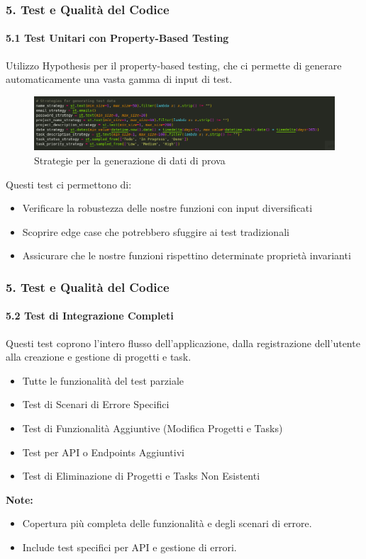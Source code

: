 \documentclass{beamer}
\begin{document}
\begin{frame}[fragile]
\frametitle{5. Test e Qualità del Codice}
\framesubtitle{5.1 Test Unitari con Property-Based Testing}
Utilizzo Hypothesis per il property-based testing, che ci permette di generare automaticamente una vasta gamma di input di test.

\begin{figure}
\includegraphics[width=\textwidth]{test_data.png}
\caption{Strategie per la generazione di dati di prova}
\end{figure}

Questi test ci permettono di:
\begin{itemize}
\item Verificare la robustezza delle nostre funzioni con input diversificati
\item Scoprire edge case che potrebbero sfuggire ai test tradizionali
\item Assicurare che le nostre funzioni rispettino determinate proprietà invarianti
\end{itemize}
\end{frame}

\begin{frame}[fragile]
\frametitle{5. Test e Qualità del Codice}
\framesubtitle{5.2 Test di Integrazione Completi}
Questi test coprono l'intero flusso dell'applicazione, dalla registrazione dell'utente alla creazione e gestione di progetti e task.

\begin{itemize}
    \item Tutte le funzionalità del test parziale
    \item Test di Scenari di Errore Specifici
    \item Test di Funzionalità Aggiuntive (Modifica Progetti e Tasks)
    \item Test per API o Endpoints Aggiuntivi
    \item Test di Eliminazione di Progetti e Tasks Non Esistenti
\end{itemize}

\textbf{Note:}
\begin{itemize}
    \item Copertura più completa delle funzionalità e degli scenari di errore.
    \item Include test specifici per API e gestione di errori.
\end{itemize}

\end{frame}
\end{document}
